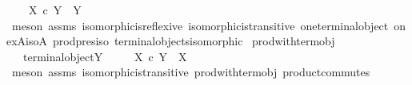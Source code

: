 \begin{isabellebody}
\ \ \ \ {\isachardoublequoteopen}X\ {\isasymtimes}\isactrlsub c\ Y\ {\isasymcong}\ Y{\isachardoublequoteclose}\ \isanewline
%
\isadelimproof
\ \ %
\endisadelimproof
%
\isatagproof
{}\isamarkupfalse%
\ {\isacharparenleft}{\kern0pt}meson\ assms\ isomorphic{\isacharunderscore}{\kern0pt}is{\isacharunderscore}{\kern0pt}reflexive\ isomorphic{\isacharunderscore}{\kern0pt}is{\isacharunderscore}{\kern0pt}transitive\ one{\isacharunderscore}{\kern0pt}terminal{\isacharunderscore}{\kern0pt}object\ one{\isacharunderscore}{\kern0pt}x{\isacharunderscore}{\kern0pt}A{\isacharunderscore}{\kern0pt}iso{\isacharunderscore}{\kern0pt}A\ prod{\isacharunderscore}{\kern0pt}pres{\isacharunderscore}{\kern0pt}iso\ terminal{\isacharunderscore}{\kern0pt}objects{\isacharunderscore}{\kern0pt}isomorphic{\isacharparenright}{\kern0pt}%
\endisatagproof
{\isafoldproof}%
%
\isadelimproof
\isanewline
%
\endisadelimproof
\isanewline
{}\isamarkupfalse%
\ prod{\isacharunderscore}{\kern0pt}with{\isacharunderscore}{\kern0pt}term{\isacharunderscore}{\kern0pt}obj{}{\isacharcolon}{\kern0pt}\isanewline
\ \ \ {\isachardoublequoteopen}terminal{\isacharunderscore}{\kern0pt}object{\isacharparenleft}{\kern0pt}Y{\isacharparenright}{\kern0pt}{\isachardoublequoteclose}\ \isanewline
\ \ \ \ {\isachardoublequoteopen}X\ {\isasymtimes}\isactrlsub c\ Y\ {\isasymcong}\ X{\isachardoublequoteclose}\isanewline
%
\isadelimproof
\ \ %
\endisadelimproof
%
\isatagproof
{}\isamarkupfalse%
\ {\isacharparenleft}{\kern0pt}meson\ assms\ isomorphic{\isacharunderscore}{\kern0pt}is{\isacharunderscore}{\kern0pt}transitive\ prod{\isacharunderscore}{\kern0pt}with{\isacharunderscore}{\kern0pt}term{\isacharunderscore}{\kern0pt}obj{}\ product{\isacharunderscore}{\kern0pt}commutes{\isacharparenright}{\kern0pt}%
\endisatagproof
{\isafoldproof}%
%
\isadelimproof
\isanewline
%
\endisadelimproof
%
\isadelimtheory
\isanewline
%
\endisadelimtheory
%
\isatagtheory
{}\isamarkupfalse%
%
\endisatagtheory
{\isafoldtheory}%
%
\isadelimtheory
%
\endisadelimtheory
%
\end{isabellebody}%
\endinput
